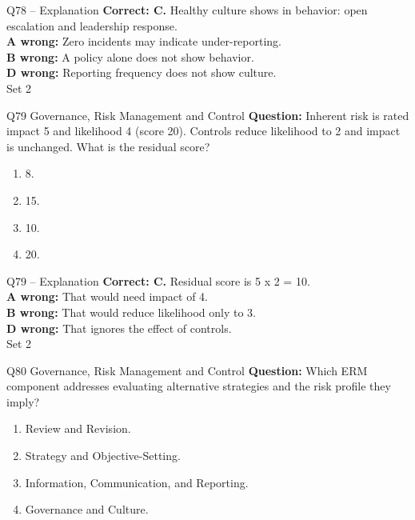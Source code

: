 \documentclass[aspectratio=169,10pt]{beamer}
\begin{document}
\begin{frame}[t]{Q78 -- Explanation}
	\footnotesize
	\textbf{Correct: C.} Healthy culture shows in behavior: open escalation and leadership response. \\[5pt]
\textbf{A wrong:} Zero incidents may indicate under-reporting. \\[3pt]
\textbf{B wrong:} A policy alone does not show behavior. \\[3pt]
\textbf{D wrong:} Reporting frequency does not show culture. \\[3pt]
	\vfill {\tiny Set 2}
\end{frame}

\begin{frame}[t]{Q79 \hfill {\scriptsize Governance, Risk Management and Control}}
	\small
	\textbf{Question:} Inherent risk is rated impact 5 and likelihood 4 (score 20). Controls reduce likelihood to 2 and impact is unchanged. What is the residual score?
	\begin{enumerate}[label=\Alph*.,itemsep=1pt,topsep=3pt]
			\item 8.
			\item 15.
			\item 10.
			\item 20.
	\end{enumerate}
\end{frame}

\begin{frame}[t]{Q79 -- Explanation}
	\footnotesize
	\textbf{Correct: C.} Residual score is 5 x 2 = 10. \\[5pt]
\textbf{A wrong:} That would need impact of 4. \\[3pt]
\textbf{B wrong:} That would reduce likelihood only to 3. \\[3pt]
\textbf{D wrong:} That ignores the effect of controls. \\[3pt]
	\vfill {\tiny Set 2}
\end{frame}

\begin{frame}[t]{Q80 \hfill {\scriptsize Governance, Risk Management and Control}}
	\small
	\textbf{Question:} Which ERM component addresses evaluating alternative strategies and the risk profile they imply?
	\begin{enumerate}[label=\Alph*.,itemsep=1pt,topsep=3pt]
			\item Review and Revision.
			\item Strategy and Objective-Setting.
			\item Information, Communication, and Reporting.
			\item Governance and Culture.
	\end{enumerate}
\end{frame}
\end{document}
